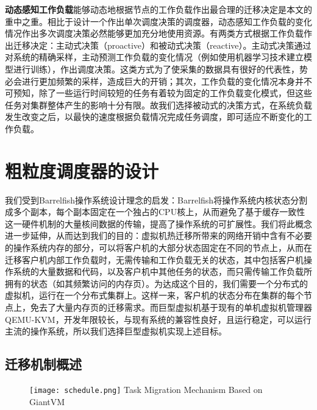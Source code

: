 \noindent\textbf{动态感知工作负载}\quad 能够动态地根据节点的工作负载作出最合理的迁移决定是本文的重中之重。相比于设计一个作出单次调度决策的调度器，动态感知工作负载的变化情况作出多次调度决策必然能够更加充分地使用资源。有两类方式根据工作负载作出迁移决定：主动式决策（proactive）和被动式决策（reactive）。主动式决策通过对系统的精确采样，主动预测工作负载的变化情况（例如使用机器学习技术建立模型进行训练），作出调度决策。这类方式为了使采集的数据具有很好的代表性，势必会进行更加频繁的采样，造成巨大的开销；其次，工作负载的变化情况本身并不可预知，除了一些运行时间较短的任务有着较为固定的工作负载变化模式，但这些任务对集群整体产生的影响十分有限。故我们选择被动式的决策方式，在系统负载发生改变之后，以最快的速度根据负载情况完成任务调度，即可适应不断变化的工作负载。

\section{粗粒度调度器的设计}
我们受到Barrelfish操作系统设计理念的启发：Barrelfish将操作系统内核状态分割成多个副本，每个副本固定在一个独占的CPU核上，从而避免了基于缓存一致性这一硬件机制的大量核间数据的传输，提高了操作系统的可扩展性。我们将此概念进一步延伸，从而达到我们的目的：虚拟机热迁移所带来的网络开销中含有不必要的操作系统内存的部分，可以将客户机的大部分状态固定在不同的节点上，从而在迁移客户机内部工作负载时，无需传输和工作负载无关的状态，其中包括客户机操作系统的大量数据和代码，以及客户机中其他任务的状态，而只需传输工作负载所拥有的状态（如其频繁访问的内存页）。为达成这个目的，我们需要一个分布式的虚拟机，运行在一个分布式集群上。这样一来，客户机的状态分布在集群的每个节点上，免去了大量内存页的迁移需求。而巨型虚拟机基于现有的单机虚拟机管理器QEMU-KVM，开发年限较长，与现有系统的兼容性良好，且运行稳定，可以运行主流的操作系统，所以我们选择巨型虚拟机实现上述目标。
\subsection{迁移机制概述}
\begin{figure}[!htp]
  \centering
  \texttt{[image: schedule.png]}
    {Task Migration Mechanism Based on GiantVM}
  \label{fig:schedule}
\end{figure}

